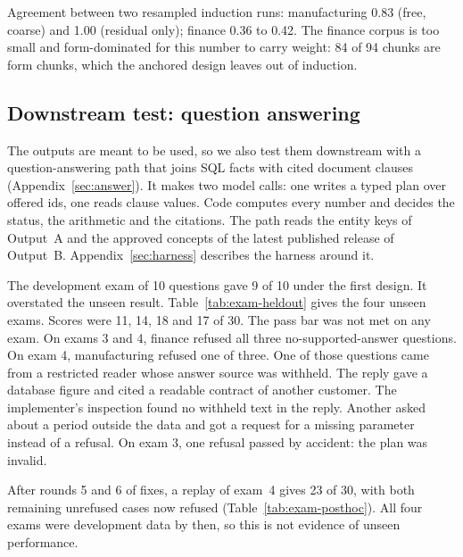 \documentclass[11pt,a4paper]{article}
\begin{document}
Agreement between two resampled induction runs: manufacturing 0.83 (free, coarse) and 1.00 (residual only); finance 0.36 to 0.42. The finance corpus is too small and form-dominated for this number to carry weight: 84 of 94 chunks are form chunks, which the anchored design leaves out of induction.

\subsection{Downstream test: question answering}\label{sec:res-answer}
The outputs are meant to be used, so we also test them downstream with a question-answering path that joins SQL facts with cited document clauses (Appendix~\ref{sec:answer}). It makes two model calls: one writes a typed plan over offered ids, one reads clause values. Code computes every number and decides the status, the arithmetic and the citations. The path reads the entity keys of Output~A and the approved concepts of the latest published release of Output~B. Appendix~\ref{sec:harness} describes the harness around it.

The development exam of 10 questions gave 9 of 10 under the first design. It overstated the unseen result. %
Table~\ref{tab:exam-heldout} gives the four unseen exams. Scores were 11, 14, 18 and 17 of 30. The pass bar was not met on any exam. %
On exams 3 and 4, finance refused all three no-supported-answer questions. On exam 4, manufacturing refused one of three. One of those questions came from a restricted reader whose answer source was withheld. The reply gave a database figure and cited a readable contract of another customer. The implementer's inspection found no withheld text in the reply. Another asked about a period outside the data and got a request for a missing parameter instead of a refusal. %
On exam 3, one refusal passed by accident: the plan was invalid. %



After rounds 5 and 6 of fixes, a replay of exam~4 gives 23 of 30, with both remaining unrefused cases now refused (Table~\ref{tab:exam-posthoc}). All four exams were development data by then, so this is not evidence of unseen performance. %
\end{document}
